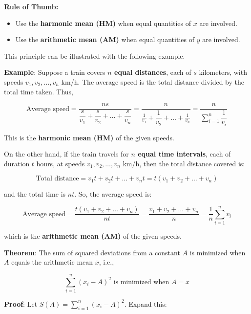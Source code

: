 \documentclass[twoside]{book}
\begin{document}
\medskip

\begin{textbox}
\textbf{Rule of Thumb:}
\begin{itemize}
    \item Use the \textbf{harmonic mean (HM)} when equal quantities of $x$ are involved.
    \item Use the \textbf{arithmetic mean (AM)} when equal quantities of $y$ are involved.
\end{itemize}
\end{textbox}

\medskip

This principle can be illustrated with the following example.

\textbf{Example}: Suppose a train covers \textbf{\( n \) equal distances}, each of \( s \) kilometers, with speeds \( v_1, v_2, \dots, v_n \) km/h. The average speed is the total distance divided by the total time taken. Thus,

\[
\text{Average speed} = \dfrac{ns}{\dfrac{s}{v_1} + \dfrac{s}{v_2} + \dots + \dfrac{s}{v_n}}
= \frac{n}{\frac{1}{v_1} + \dfrac{1}{v_2} + \dots + \frac{1}{v_n}}
= \dfrac{n}{\displaystyle \sum_{i=1}^n \dfrac{1}{v_i}}
\]

This is the \textbf{harmonic mean (HM)} of the given speeds.

\medskip

On the other hand, if the train travels for \textbf{\( n \) equal time intervals}, each of duration \( t \) hours, at speeds \( v_1, v_2, \dots, v_n \) km/h, then the total distance covered is:

\[
\text{Total distance} = v_1t + v_2t + \dots + v_nt = t(v_1 + v_2 + \dots + v_n)
\]

and the total time is \( nt \). So, the average speed is:

\[
\text{Average speed} = \frac{t(v_1 + v_2 + \dots + v_n)}{nt} = \frac{v_1 + v_2 + \dots + v_n}{n}
= \frac{1}{n} \sum_{i=1}^n v_i
\]

which is the \textbf{arithmetic mean (AM)} of the given speeds.


\begin{textbox}
    \textbf{Theorem}: The sum of squared deviations from a constant \( A \) is minimized when \( A \) equals the arithmetic mean \( \overline{x} \), i.e.,

\[
\sum_{i=1}^n (x_i - A)^2 \text{ is minimized when } A = \overline{x}
\]
\end{textbox}

\textbf{Proof}: Let \( S(A) = \sum_{i=1}^n (x_i - A)^2 \). Expand this:
\end{document}
